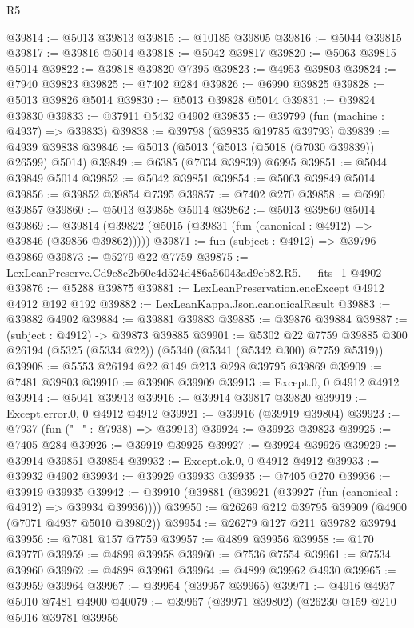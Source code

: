 \begin{lexlean}{R5}
\begin{coremodule}
@39814 := @5013 @39813
@39815 := @10185 @39805
@39816 := @5044 @39815
@39817 := @39816 @5014
@39818 := @5042 @39817
@39820 := @5063 @39815 @5014
@39822 := @39818 @39820 @7395
@39823 := @4953 @39803
@39824 := @7940 @39823
@39825 := @7402 @284
@39826 := @6990 @39825
@39828 := @5013 @39826 @5014
@39830 := @5013 @39828 @5014
@39831 := @39824 @39830
@39833 := @37911 @5432 @4902
@39835 := @39799 (fun (machine : @4937) => @39833)
@39838 := @39798 (@39835 @19785 @39793)
@39839 := @4939 @39838
@39846 := @5013 (@5013 (@5013 (@5018 (@7030 @39839)) @26599) @5014)
@39849 := @6385 (@7034 @39839) @6995
@39851 := @5044 @39849 @5014
@39852 := @5042 @39851
@39854 := @5063 @39849 @5014
@39856 := @39852 @39854 @7395
@39857 := @7402 @270
@39858 := @6990 @39857
@39860 := @5013 @39858 @5014
@39862 := @5013 @39860 @5014
@39869 := @39814 (@39822 (@5015 (@39831 (fun (canonical : @4912) => @39846 (@39856 @39862)))))
@39871 := fun (subject : @4912) => @39796 @39869
@39873 := @5279 @22 @7759
@39875 := LexLeanPreserve.Cd9c8c2b60c4d524d486a56043ad9eb82.R5.__fits_1 @4902
@39876 := @5288 @39875
@39881 := LexLeanPreservation.encExcept @4912 @4912 @192 @192
@39882 := LexLeanKappa.Json.canonicalResult
@39883 := @39882 @4902
@39884 := @39881 @39883
@39885 := @39876 @39884
@39887 := (subject : @4912) -> @39873 @39885
@39901 := @5302
    @22
    @7759
    @39885
    @300
    @26194
    (@5325 (@5334 @22))
    (@5340 (@5341 (@5342 @300) @7759 @5319))
@39908 := @5553 @26194 @22 @149 @213 @298 @39795 @39869
@39909 := @7481 @39803
@39910 := @39908 @39909
@39913 := Except.{0, 0} @4912 @4912
@39914 := @5041 @39913
@39916 := @39914 @39817 @39820
@39919 := Except.error.{0, 0} @4912 @4912
@39921 := @39916 (@39919 @39804)
@39923 := @7937 (fun ("_" : @7938) => @39913)
@39924 := @39923 @39823
@39925 := @7405 @284
@39926 := @39919 @39925
@39927 := @39924 @39926
@39929 := @39914 @39851 @39854
@39932 := Except.ok.{0, 0} @4912 @4912
@39933 := @39932 @4902
@39934 := @39929 @39933
@39935 := @7405 @270
@39936 := @39919 @39935
@39942 := @39910 (@39881 (@39921 (@39927 (fun (canonical : @4912) => @39934 @39936))))
@39950 := @26269 @212 @39795 @39909 (@4900 (@7071 @4937 @5010 @39802))
@39954 := @26279 @127 @211 @39782 @39794
@39956 := @7081 @157 @7759
@39957 := @4899 @39956
@39958 := @170 @39770
@39959 := @4899 @39958
@39960 := @7536 @7554
@39961 := @7534 @39960
@39962 := @4898 @39961
@39964 := @4899 @39962 @4930
@39965 := @39959 @39964
@39967 := @39954 (@39957 @39965)
@39971 := @4916 @4937 @5010 @7481 @4900
@40079 := @39967
    (@39971 @39802)
    (@26230
      @159
      @210
      @5016
      @39781
      @39956

\end{coremodule}
\end{lexlean}
